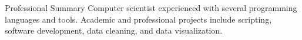 \begin{rSection}{Professional Summary}
	Computer scientist experienced with several programming languages and tools. Academic and professional projects include scripting, software development, data cleaning, and data visualization.
\end{rSection}
